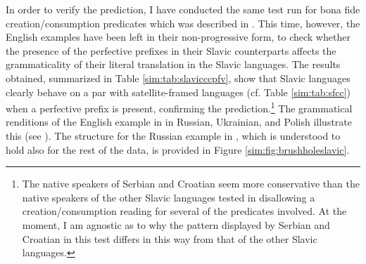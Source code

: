 \documentclass[output=paper,colorlinks,citecolor=brown]{langscibook}
\begin{document}
In order to verify the prediction, I have conducted the same test run for bona fide creation/consumption predicates which was described in . This time, however, the English examples have been left in their non-progressive form, to check wheth\-er the presence of the perfective prefixes in their Slavic counterparts affects the grammaticality of their literal translation in the Slavic languages. The results obtained, summarized in Table \ref{sim:tab:slavicccpfv}, show that Slavic languages clearly behave on a par with satellite-framed languages (cf. Table \ref{sim:tab:sfcc}) when a perfective prefix is present, confirming the prediction.\footnote{The native speakers of Serbian and Croatian seem more conservative than the native speakers of the other Slavic languages tested in disallowing a creation/consumption reading for several of the predicates involved. At the moment, I am agnostic as to why the pattern displayed by Serbian and Croatian in this test differs in this way from that of the other Slavic languages.} The grammatical renditions of the English example in  in Russian, Ukrainian, and Polish illustrate this (see ). The structure for the Russian example in , which is understood to hold also for the rest of the data, is provided in Figure \ref{sim:fig:brushholeslavic}.
\end{document}
